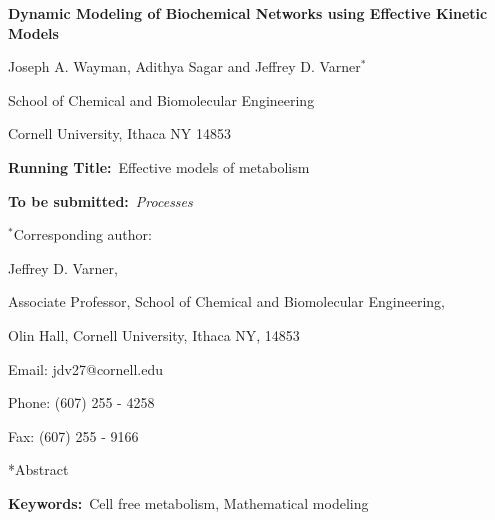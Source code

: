 \documentclass[12pt]{article}
\makeatletter
\renewcommand\section{\@startsection
	{subsection}{2}{0mm}
	{-0.2in}
	{0.05\baselineskip}
	{\normalfont\large\bfseries}}
\makeatother
\begin{document}
\begin{titlepage}
{\par\centering\textbf{\Large Dynamic Modeling of Biochemical Networks using Effective Kinetic Models}}
\vspace{0.05in}
{\par \centering \large{Joseph A. Wayman, Adithya Sagar and Jeffrey D. Varner$^{*}$}}
\vspace{0.10in}
{\par \centering \large{School of Chemical and Biomolecular Engineering}}
{\par \centering \large{Cornell University, Ithaca NY 14853}}
\vspace{0.1in}
{\par \centering \textbf{Running Title:}~Effective models of metabolism}
\vspace{0.1in}
{\par \centering \textbf{To be submitted:}~\emph{Processes}}
\vspace{0.5in}
{\par \centering $^{*}$Corresponding author:}
{\par \centering Jeffrey D. Varner,}
{\par \centering Associate Professor, School of Chemical and Biomolecular Engineering,}
{\par {} Olin Hall, Cornell University, Ithaca NY, 14853} 
{\par \centering Email: jdv27@cornell.edu} 
{\par \centering Phone: (607) 255 - 4258}
{\par \centering Fax: (607) 255 - 9166}
\end{titlepage}
\date{}
\thispagestyle{empty}
\pagebreak
\section*{Abstract}

{\noindent \textbf{Keywords:}~Cell free metabolism, Mathematical modeling}

\pagebreak

\setcounter{page}{1}

\linenumbers
\end{document}

